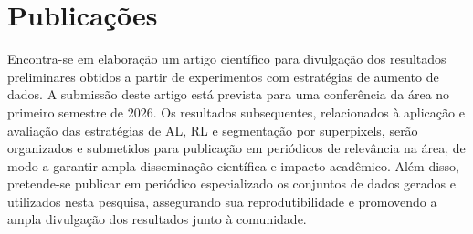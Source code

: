 







\section{Publicações}

Encontra-se em elaboração um artigo científico para divulgação dos resultados preliminares obtidos a partir de experimentos com estratégias de aumento de dados. A submissão deste artigo está prevista para uma conferência da área no primeiro semestre de 2026.
Os resultados subsequentes, relacionados à aplicação e avaliação das estratégias de \ac{AL}, \ac{RL} e segmentação por superpixels, serão organizados e submetidos para publicação em periódicos de relevância na área, de modo a garantir ampla disseminação científica e impacto acadêmico. Além disso, pretende-se publicar em periódico especializado os conjuntos de dados gerados e utilizados nesta pesquisa, assegurando sua reprodutibilidade e promovendo a ampla divulgação dos resultados junto à comunidade.

